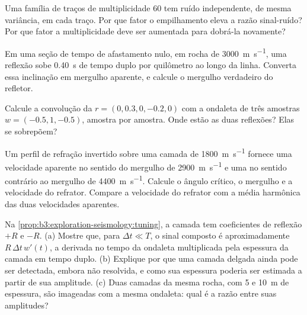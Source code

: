 \begin{exercise}[$\star\star$]\label{exo:b3:exploration-seismology:7}
Uma família de traços de multiplicidade 60 tem ruído independente, de mesma variância, em cada traço. Por
que fator o empilhamento eleva a razão sinal-ruído? Por que fator a multiplicidade deve ser aumentada
para dobrá-la novamente?
\end{exercise}

\begin{exercise}[$\star\star$]\label{exo:b3:exploration-seismology:8}
Em uma seção de tempo de afastamento nulo, em rocha de \qty{3000}{m.s^{-1}}, uma reflexão
sobe \qty{0.40}{s} de tempo duplo por quilômetro ao longo da linha. Converta essa
inclinação em mergulho aparente, e calcule o mergulho verdadeiro do refletor.
\end{exercise}

\begin{exercise}[$\star\star$]\label{exo:b3:exploration-seismology:9}
Calcule a convolução da  $r = (0, 0.3, 0, -0.2, 0)$ com a
ondaleta de três amostras $w = (-0.5, 1, -0.5)$, amostra por amostra. Onde estão as duas
reflexões? Elas se sobrepõem?
\end{exercise}

\begin{exercise}[$\star\star\star$]\label{exo:b3:exploration-seismology:10}
Um perfil de refração invertido sobre uma camada de \qty{1800}{m.s^{-1}} fornece uma
velocidade aparente no sentido do mergulho de \qty{2900}{m.s^{-1}} e uma no sentido contrário ao mergulho de
\qty{4400}{m.s^{-1}}. Calcule o ângulo crítico, o mergulho e a
velocidade do refrator. Compare a velocidade do refrator com a média harmônica das duas
velocidades aparentes.
\end{exercise}

\begin{exercise}[$\star\star\star$]\label{exo:b3:exploration-seismology:11}
Na \cref{prop:b3:exploration-seismology:tuning}, a camada tem coeficientes de reflexão
$+R$ e $-R$. (a) Mostre que, para $\Delta t \ll T$, o sinal composto
é aproximadamente $R\,\Delta t\,w'(t)$, a derivada no tempo da ondaleta
multiplicada pela espessura da camada em tempo duplo. (b) Explique por que uma camada delgada ainda pode ser
detectada, embora não resolvida, e como sua espessura poderia ser estimada a partir de
sua amplitude. (c) Duas camadas da mesma rocha, com 5 e \qty{10}{m} de espessura, são
imageadas com a mesma ondaleta: qual é a razão entre suas amplitudes?
\end{exercise}

